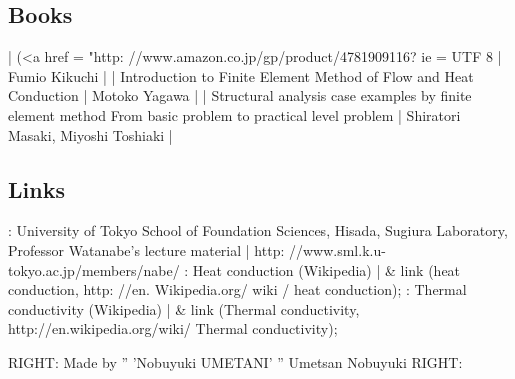 \subsection{Books}
| (<a href = "http: //www.amazon.co.jp/gp/product/4781909116? ie = UTF 8 | Fumio Kikuchi |
| Introduction to Finite Element Method of Flow and Heat Conduction | Motoko Yagawa |
| Structural analysis case examples by finite element method From basic problem to practical level problem | Shiratori Masaki, Miyoshi Toshiaki |
\subsection{Links}
: University of Tokyo School of Foundation Sciences, Hisada, Sugiura Laboratory, Professor Watanabe's lecture material | http: //www.sml.k.u-tokyo.ac.jp/members/nabe/
: Heat conduction (Wikipedia) | & link (heat conduction, http: //en. Wikipedia.org/ wiki / heat conduction);
: Thermal conductivity (Wikipedia) | & link (Thermal conductivity, http://en.wikipedia.org/wiki/ Thermal conductivity);

RIGHT: Made by '' 'Nobuyuki UMETANI' '' Umetsan Nobuyuki
RIGHT:
\fi


